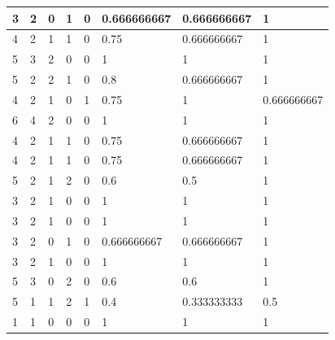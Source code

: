 \begin{small}
\begin{longtable}{|l|l|l|l|l|l|l|l|}
3  & 2           & 0           & 1           & 0           & 0.666666667       & 0.666666667        & 1               \\ \hline
4  & 2           & 1           & 1           & 0           & 0.75              & 0.666666667        & 1               \\ \hline
5  & 3           & 2           & 0           & 0           & 1                 & 1                  & 1               \\ \hline
5  & 2           & 2           & 1           & 0           & 0.8               & 0.666666667        & 1               \\ \hline
4  & 2           & 1           & 0           & 1           & 0.75              & 1                  & 0.666666667     \\ \hline
6  & 4           & 2           & 0           & 0           & 1                 & 1                  & 1               \\ \hline
4  & 2           & 1           & 1           & 0           & 0.75              & 0.666666667        & 1               \\ \hline
4  & 2           & 1           & 1           & 0           & 0.75              & 0.666666667        & 1               \\ \hline
5  & 2           & 1           & 2           & 0           & 0.6               & 0.5                & 1               \\ \hline
3  & 2           & 1           & 0           & 0           & 1                 & 1                  & 1               \\ \hline
3  & 2           & 1           & 0           & 0           & 1                 & 1                  & 1               \\ \hline
3  & 2           & 0           & 1           & 0           & 0.666666667       & 0.666666667        & 1               \\ \hline
3  & 2           & 1           & 0           & 0           & 1                 & 1                  & 1               \\ \hline
5  & 3           & 0           & 2           & 0           & 0.6               & 0.6                & 1               \\ \hline
5  & 1           & 1           & 2           & 1           & 0.4               & 0.333333333        & 0.5             \\ \hline
1  & 1           & 0           & 0           & 0           & 1                 & 1                  & 1               \\ \hline

\end{longtable}
\end{small}
